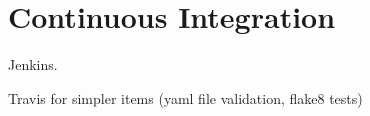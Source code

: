 \section{Continuous Integration}

Jenkins.\label{sec:jenkins}

Travis for simpler items (yaml file validation, flake8 tests)
